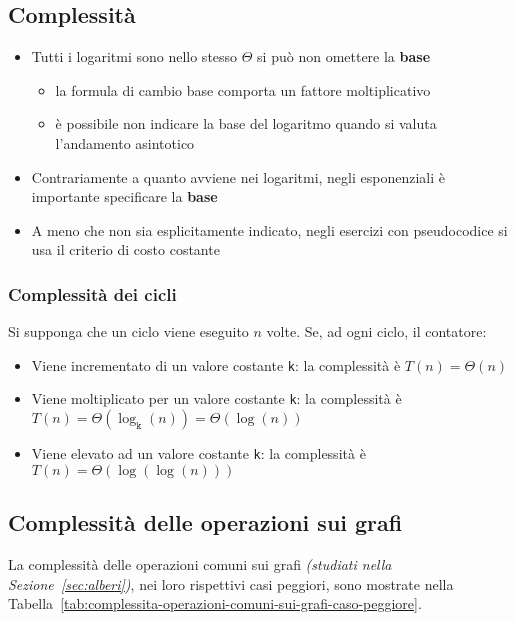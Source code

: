 \documentclass[italian, 10pt]{article}
\begin{document}
\subsection{Complessità}

\begin{itemize}
  \item Tutti i logaritmi sono nello stesso \(\Theta\) si può non omettere la \textbf{base}
        \begin{itemize}
          \item la formula di cambio base comporta un fattore moltiplicativo
          \item è possibile non indicare la base del logaritmo quando si valuta l'andamento asintotico
        \end{itemize}
  \item Contrariamente a quanto avviene nei logaritmi, negli esponenziali è importante specificare la \textbf{base}
  \item A meno che non sia esplicitamente indicato, negli esercizi con pseudocodice si usa il criterio di costo costante
\end{itemize}

\subsubsection{Complessità dei cicli}

Si supponga che un ciclo viene eseguito \(n\) volte.
Se, ad ogni ciclo, il contatore:

\begin{itemize}
  \item Viene incrementato di un valore costante \texttt{k}: la complessità è \(T(n) = \Theta(n)\)
  \item Viene moltiplicato per un valore costante \texttt{k}: la complessità è \(T(n) = \Theta\left(\log_\texttt{k}{(n)}\right) = \Theta\left(\log{(n)}\right)\)
  \item Viene elevato ad un valore costante \texttt{k}: la complessità è \(T(n) = \Theta\left(\log{\left(\log{(n)}\right)}\right)\)
\end{itemize}

\subsection{Complessità delle operazioni sui grafi}

La complessità delle operazioni comuni sui grafi \textit{(studiati nella Sezione~\ref{sec:alberi})}, nei loro rispettivi casi peggiori, sono mostrate nella Tabella~\ref{tab:complessita-operazioni-comuni-sui-grafi-caso-peggiore}.
\end{document}
